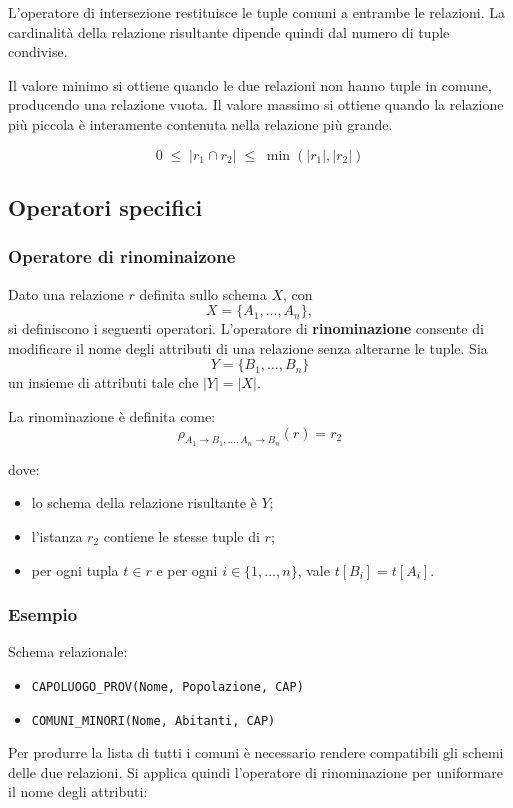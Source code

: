 L'operatore di intersezione restituisce le tuple comuni a entrambe le
relazioni.  
La cardinalità della relazione risultante dipende quindi dal numero di
tuple condivise.

Il valore minimo si ottiene quando le due relazioni non hanno tuple in
comune, producendo una relazione vuota.  
Il valore massimo si ottiene quando la relazione più piccola è
interamente contenuta nella relazione più grande.

\[
0 \;\le\; |r_1 \cap r_2| \;\le\; \min(|r_1|, |r_2|)
\]
\subsection{Operatori specifici}
\subsubsection{Operatore di rinominaizone}
Dato una relazione $r$ definita sullo schema $X$, con
\[
X = \{A_1, \dots, A_n\},
\]
si definiscono i seguenti operatori.
L'operatore di \textbf{rinominazione} consente di modificare il nome degli
attributi di una relazione senza alterarne le tuple.  
Sia
\[
Y = \{B_1, \dots, B_n\}
\]
un insieme di attributi tale che $|Y| = |X|$.

La rinominazione è definita come:
\[
\rho_{A_1 \rightarrow B_1, \dots, A_n \rightarrow B_n}(r) = r_2
\]

dove:
\begin{itemize}
	\item lo schema della relazione risultante è $Y$;
	\item l'istanza $r_2$ contiene le stesse tuple di $r$;
	\item per ogni tupla $t \in r$ e per ogni $i \in \{1, \dots, n\}$,
	vale $t[B_i] = t[A_i]$.
\end{itemize}
\subsubsection*{Esempio}

Schema relazionale:
\begin{itemize}
	\item \texttt{CAPOLUOGO\_PROV(Nome, Popolazione, CAP)}
	\item \texttt{COMUNI\_MINORI(Nome, Abitanti, CAP)}
\end{itemize}

Per produrre la lista di tutti i comuni è necessario rendere compatibili
gli schemi delle due relazioni.  
Si applica quindi l'operatore di rinominazione per uniformare il nome
degli attributi:

